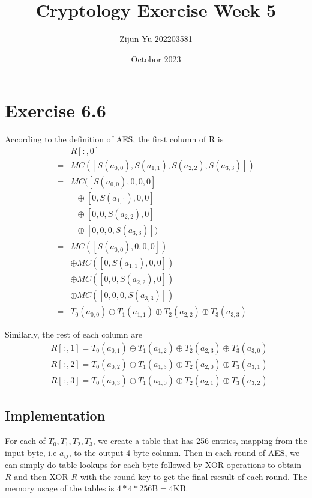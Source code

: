 \documentclass{article}
\title{Cryptology Exercise Week 5}
\author{Zijun Yu 202203581}
\date{Octobor 2023}
\begin{document}
\maketitle

\section*{Exercise 6.6}

According to the definition of AES, the first column of R
is
\begin{equation*}
    \begin{split}
        & R[:,0] \\
        = & MC([S(a_{0,0}), S(a_{1,1}), S(a_{2,2}), S(a_{3,3})]) \\
        = &  MC([S(a_{0,0}), 0, 0, 0] \\
        & \ \ \ \oplus [0, S(a_{1,1}), 0, 0] \\
        & \ \ \ \oplus [0, 0, S(a_{2,2}), 0] \\
        & \ \ \ \oplus [0, 0, 0, S(a_{3,3})]) \\
        = & MC([S(a_{0,0}), 0, 0, 0]) \\
& \oplus MC([0, S(a_{1,1}), 0, 0]) \\
        & \oplus MC([0, 0, S(a_{2,2}), 0]) \\
        & \oplus MC([0, 0, 0, S(a_{3,3})]) \\
        = & T_0(a_{0,0}) \oplus T_1(a_{1,1}) \oplus T_2(a_{2,2}) \oplus T_3(a_{3,3})
    \end{split}
\end{equation*}

Similarly, the rest of each column are
\begin{equation*}
    \begin{split}
        & R[:,1] = T_0(a_{0,1}) \oplus T_1(a_{1,2}) \oplus T_2(a_{2,3}) \oplus T_3(a_{3,0}) \\
        & R[:,2] = T_0(a_{0,2}) \oplus T_1(a_{1,3}) \oplus T_2(a_{2,0}) \oplus T_3(a_{3,1}) \\
        & R[:,3] =T_0(a_{0,3}) \oplus T_1(a_{1,0}) \oplus T_2(a_{2,1}) \oplus T_3(a_{3,2})
    \end{split}
\end{equation*}

\subsection*{Implementation}

For each of $T_0, T_1, T_2, T_3$, we create a table that has 256 entries,
mapping from the input byte, i.e $a_{ij}$, to the output 4-byte column.
Then in each round of AES, we can simply do table lookups for each byte
followed by XOR operations to obtain $R$ and then XOR $R$ with the round key
to get the final rsesult of each round.
The memory usage of the tables is $4 * 4 * 256\text{B} = 4$KB.
\end{document}
